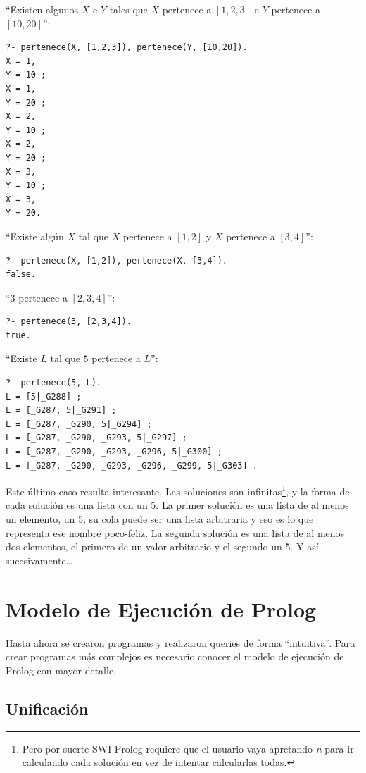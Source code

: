 \documentclass[12pt,titlepage]{article}
\begin{document}
``Existen algunos $X$ e $Y$ tales que $X$ pertenece a $[1,2,3]$ e $Y$ pertenece a $[10,20]$'':
\begin{lstlisting}
?- pertenece(X, [1,2,3]), pertenece(Y, [10,20]).
X = 1,
Y = 10 ;
X = 1,
Y = 20 ;
X = 2,
Y = 10 ;
X = 2,
Y = 20 ;
X = 3,
Y = 10 ;
X = 3,
Y = 20.
\end{lstlisting}

``Existe algún $X$ tal que $X$ pertenece a $[1, 2]$ y $X$ pertenece a $[3, 4]$'':
\begin{lstlisting}
?- pertenece(X, [1,2]), pertenece(X, [3,4]).
false.

\end{lstlisting}

``$3$ pertenece a $[2,3,4]$'':
\begin{lstlisting}
?- pertenece(3, [2,3,4]).
true.
\end{lstlisting}

``Existe $L$ tal que $5$ pertenece a $L$'':
\begin{lstlisting}
?- pertenece(5, L).
L = [5|_G288] ;
L = [_G287, 5|_G291] ;
L = [_G287, _G290, 5|_G294] ;
L = [_G287, _G290, _G293, 5|_G297] ;
L = [_G287, _G290, _G293, _G296, 5|_G300] ;
L = [_G287, _G290, _G293, _G296, _G299, 5|_G303] .
\end{lstlisting}

Este último caso resulta interesante. Las soluciones son infinitas\footnote{Pero por suerte SWI Prolog requiere que el usuario vaya apretando \emph{n} para ir calculando cada solución en vez de intentar calcularlas todas.}, y la forma de cada solución es una lista con un 5. La primer solución es una lista de al menos un elemento, un 5; su cola puede ser una lista arbitraria y eso es lo que representa ese nombre poco-feliz. La segunda solución es una lista de al menos dos elementos, el primero de un valor arbitrario y el segundo un 5. Y así sucesivamente\dots

\newpage
\section{Modelo de Ejecución de Prolog}

Hasta ahora se crearon programas y realizaron queries de forma ``intuitiva''. Para crear programas más complejos es necesario conocer el modelo de ejecución de Prolog con mayor detalle.

\subsection{Unificación}
\end{document}

